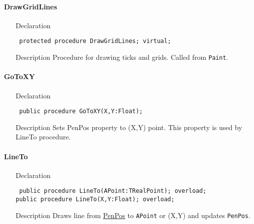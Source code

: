 \documentclass[12pt,a4paper,oneside]{report}
\newcommand{\declarationitem}[1]{{\addfontfeatures{FakeBold=1.3} #1}}
\newcommand{\descriptiontitle}[1]{{\addfontfeatures{FakeSlant}#1}}
\newcommand{\code}[1]{\texttt{#1}}
\begin{document}
\paragraph{DrawGridLines}\hspace*{\fill}
\label{lmcoordsys.TCoordSys-DrawGridLines}
\begin{itemize}\item[\declarationitem{Declaration}\hfill]
	\begin{flushleft}
		\code{
			protected procedure DrawGridLines; virtual;}
	\end{flushleft}
	\item[\descriptiontitle{Description}] Procedure for drawing ticks and grids. Called from \code{Paint}.
\end{itemize}




\paragraph{GoToXY}\hspace*{\fill}\label{lmcoordsys.TCoordSys-GoToXY}
\begin{itemize}\item[\declarationitem{Declaration}\hfill]
	\begin{flushleft}
		\code{
			public procedure GoToXY(X,Y:Float);}
	\end{flushleft}
	\item[\descriptiontitle{Description}]
	Sets PenPos property to (X,Y) point. This property is used by LineTo procedure.
	
\end{itemize}
\paragraph{LineTo}\label{sec:lineto}\hspace*{\fill}
\label{lmcoordsys.TCoordSys-LineTo}
\begin{itemize}\item[\declarationitem{Declaration}\hfill]
\begin{flushleft}
\code{
public procedure LineTo(APoint:TRealPoint); overload;\\
public procedure LineTo(X,Y:Float); overload;}
\end{flushleft}
\item[\descriptiontitle{Description}]
Draws line from \hyperref[lmcoordsys.TCoordSys-PenPos]{PenPos} to \code{APoint} or (X,Y) and updates \code{PenPos}.
\end{itemize}
\end{document}
